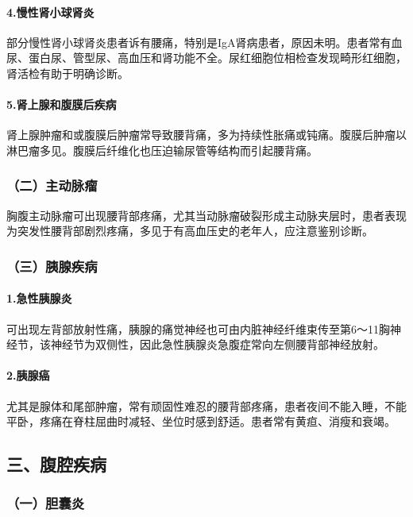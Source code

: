 \paragraph{4.慢性肾小球肾炎}

部分慢性肾小球肾炎患者诉有腰痛，特别是IgA肾病患者，原因未明。患者常有血尿、蛋白尿、管型尿、高血压和肾功能不全。尿红细胞位相检查发现畸形红细胞，肾活检有助于明确诊断。

\paragraph{5.肾上腺和腹膜后疾病}

肾上腺肿瘤和或腹膜后肿瘤常导致腰背痛，多为持续性胀痛或钝痛。腹膜后肿瘤以淋巴瘤多见。腹膜后纤维化也压迫输尿管等结构而引起腰背痛。

\subsubsection{（二）主动脉瘤}

胸腹主动脉瘤可出现腰背部疼痛，尤其当动脉瘤破裂形成主动脉夹层时，患者表现为突发性腰背部剧烈疼痛，多见于有高血压史的老年人，应注意鉴别诊断。

\subsubsection{（三）胰腺疾病}

\paragraph{1.急性胰腺炎}

可出现左背部放射性痛，胰腺的痛觉神经也可由内脏神经纤维束传至第6～11胸神经节，该神经节为双侧性，因此急性胰腺炎急腹症常向左侧腰背部神经放射。

\paragraph{2.胰腺癌}

尤其是腺体和尾部肿瘤，常有顽固性难忍的腰背部疼痛，患者夜间不能入睡，不能平卧，疼痛在脊柱屈曲时减轻、坐位时感到舒适。患者常有黄疸、消瘦和衰竭。

\subsection{三、腹腔疾病}

\subsubsection{（一）胆囊炎}

